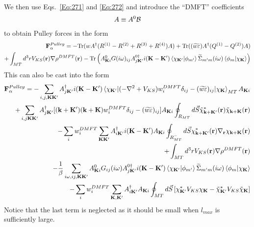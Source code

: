 \documentclass[aps,prb,floatfix,epsfig,singlecolumn,showpacs,preprintnumbers]{revtex4}
\newcommand{\vF}{{\mathbf{F}}}
\renewcommand{\vr}{{\mathbf{r}}}
\newcommand{\vk}{{\mathbf{k}}}
\newcommand{\vK}{{\mathbf{K}}}
\newcommand{\Tr}{\mathrm{Tr}}
\newcommand{\cB}{{\cal B}}
\begin{document}
We then use Eqs.~\ref{Eq:271} and \ref{Eq:272} and introduce the ``DMFT'' coefficients 
\begin{eqnarray}
A \equiv A^0 \cB
\end{eqnarray}
to obtain Pulley forces in the form
\begin{eqnarray}
\vF^{Pulley}_{\alpha} = 
-\Tr( w A^{\dagger}(R^{(1)}-R^{(2)}+R^{(3)}+R^{(4)}) A)
+\Tr( (\widetilde{w\varepsilon}) A^{\dagger}(Q^{(1)}-Q^{(2)})A) \\
+\int_{MT} d^3r V_{KS}(\vr)\nabla\rho^{DMFT}(\vr)
-\Tr\left(
A^0_{\vK i} 
G(i\omega)_{ij}
A^{0\dagger}_{j\vK'}
i(\vK-\vK')\braket{\chi_{\vK'}|\phi_{m'}}\widetilde{\Sigma}_{m'm}(i\omega)\braket{\phi_m|\chi_{\vK}}
\right)
% 
\end{eqnarray}
This can also be cast into the form 
\begin{eqnarray}
\vF^{Pulley}_{\alpha} = -\sum_{i,j,\vK\vK'} A_{j\vK'}^{\dagger}  i(\vK-\vK')\braket{\chi_{\vK'}|(-\nabla^2+V_{KS}) w^{DMFT}_i\delta_{ij}-(\widetilde{w\varepsilon})_{ij}|\chi_\vK}_{MT}  A_{\vK i}
\label{Eq:305}\\
+\sum_{i,j\vK\vK'}A^{\dagger}_{j\vK'} [(\vk+\vK')(\vk+\vK) w^{DMFT}_i \delta_{ij}-(\widetilde{w\varepsilon})_{ij} ] A_{\vK i}\oint_{R_{MT}}d\vec{S}\tilde{\chi}_{\vk+\vK'}^*(\vr)\tilde{\chi}_{\vk+\vK}(\vr)
\label{Eq:306}\\
-\sum_i w^{DMFT}_i\sum_{\vK\vK'} A^{\dagger}_{i\vK'}  i(\vK-\vK')  A_{\vK i} \oint_{R_{MT}^-} d\vec{S}\chi^*_{\vk+\vK'}(\vr)\nabla_\vr \chi_{\vk+\vK}(\vr)
\label{Eq:307}\\
+\int_{MT} d^3r V_{KS}(\vr)\nabla\rho^{DMFT}(\vr)
\label{Eq:308}\\
-\frac{1}{\beta}\sum_{i\omega,ij,\vK\vK'}A^0_{\vK i} G_{ij}(i\omega) A^{0\dagger}_{j\vK'}i(\vK-\vK')\braket{\chi_{\vK'}|\phi_{m'}}\widetilde{\Sigma}_{m'm}(i\omega)\braket{\phi_m|\chi_{\vK}}
\label{Eq:309}\\
-\sum_i w_i^{DMFT}\sum_{\vK,\vK'} A^\dagger_{i\vK'} A_{\vK i} \oint_{MT}d\vec{S}
\left[\chi_{\vK'}^* V_{KS}\chi_{\vK} - \tilde{\chi}_{\vK'}^* V_{KS}\tilde{\chi}_{\vK}\right]
\label{Eq:310}
\end{eqnarray}
Notice that the last term is neglected as it should be small when
$l_{max}$ is sufficiently large.
\end{document}
